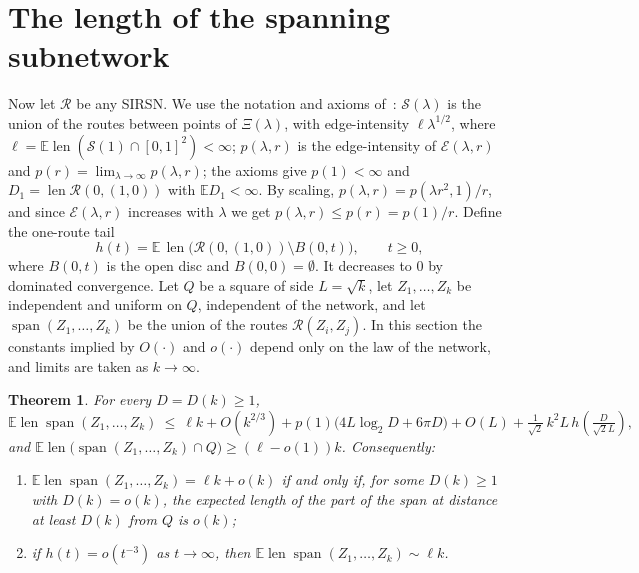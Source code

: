 \documentclass[11pt]{amsart}
\newtheorem{theorem}{Theorem}[section]
\theoremstyle{remark}
\newcommand{\E}{\mathbb{E}}
\newcommand{\len}{\operatorname{len}}
\newcommand{\spn}{\operatorname{span}}
\begin{document}
\section{The length of the spanning subnetwork}\label{sec:span}

Now let $\mathcal R$ be any SIRSN. We use the notation and axioms of~\cite{A14}: $\mathcal S(\lambda)$ is the union of
the routes between points of $\Xi(\lambda)$, with edge-intensity $\ell\lambda^{1/2}$, where
$\ell=\E\len(\mathcal S(1)\cap[0,1]^2)<\infty$; $p(\lambda,r)$ is the edge-intensity of $\mathcal E(\lambda,r)$ and
$p(r)=\lim_{\lambda\to\infty}p(\lambda,r)$; the axioms give $p(1)<\infty$ and $D_1=\len\mathcal R(0,(1,0))$ with
$\E D_1<\infty$. By scaling, $p(\lambda,r)=p(\lambda r^2,1)/r$, and since $\mathcal E(\lambda,r)$ increases with
$\lambda$ we get $p(\lambda,r)\le p(r)=p(1)/r$. Define the one-route tail
\[
h(t)=\E\,\len\bigl(\mathcal R(0,(1,0))\setminus B(0,t)\bigr),\qquad t\ge0 ,
\]
where $B(0,t)$ is the open disc and $B(0,0)=\emptyset$. It decreases to $0$ by dominated convergence. Let $Q$ be a
square of side $L=\sqrt k$, let $Z_1,\dots,Z_k$ be independent and uniform on $Q$, independent of the network, and let
$\spn(Z_1,\dots,Z_k)$ be the union of the routes $\mathcal R(Z_i,Z_j)$. In this section the constants implied by
$O(\cdot)$ and $o(\cdot)$ depend only on the law of the network, and limits are taken as $k\to\infty$.

\begin{theorem}\label{thm:span}
For every $D=D(k)\ge1$,
\[
\E\len\spn(Z_1,\dots,Z_k)\ \le\ \ell k+O(k^{2/3})+p(1)\bigl(4L\log_2D+6\pi D\bigr)+O(L)
+\tfrac{1}{\sqrt2}\,k^2L\,h\!\left(\tfrac{D}{\sqrt2L}\right),
\]
and $\E\len\bigl(\spn(Z_1,\dots,Z_k)\cap Q\bigr)\ge(\ell-o(1))k$. Consequently:
\begin{enumerate}
\item $\E\len\spn(Z_1,\dots,Z_k)=\ell k+o(k)$ if and only if, for some $D(k)\ge1$ with $D(k)=o(k)$, the expected length
of the part of the span at distance at least $D(k)$ from $Q$ is $o(k)$;
\item if $h(t)=o(t^{-3})$ as $t\to\infty$, then $\E\len\spn(Z_1,\dots,Z_k)\sim\ell k$.
\end{enumerate}
\end{theorem}
\end{document}
